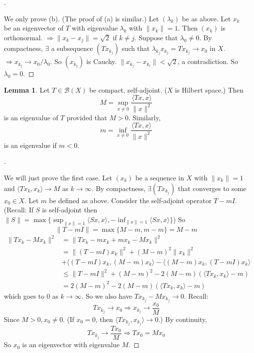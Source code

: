 \documentclass{article}
\theoremstyle{definition}
\newtheorem{lem}{Lemma}
\newenvironment{proofs}[1][\proofname]{%
  \begin{proof}[#1]$ $\par\nobreak\ignorespaces
}{%
  \end{proof}
}
\newcommand{\B}{\mathcal B}
\begin{document}
\begin{proofs}
	We only prove (b).
	(The proof of (a) is similar.)
	Let $(\lambda_k)$ be as above.
	Let $x_k$ be an eigenvector of $T$ with eigenvalue $\lambda_k$ with $\|x_k\| = 1$.
	Then $(x_k)$ is orthonormal.
	$\Rightarrow \|x_k - x_j\| = \sqrt{2}$ if $k \neq j$.
	Suppose that $\lambda_0 \neq 0$.
	By compactness, $\exists$ a subsequence $(T x_{k_j})$ such that $\lambda_{k_j} x_{k_j} = T x_{k_j} \to x_0$ in $X$.
	$\Rightarrow x_{k_j} \to x_0/\lambda_0$.
	So $(x_{k_j})$ is Cauchy.
	$\|x_{k_j} - x_{k_l}\| < \sqrt{2}$, a contradiction.
	So $\lambda_0 = 0$.
\end{proofs}

\begin{lem}
	Let $T \in \B(X)$ be compact, self-adjoint. 
	($X$ is Hilbert space.)
	Then
	\[
		M = \sup_{x \neq 0} \frac{\langle T x, x \rangle}{\|x\|^2}
	\]
	is an eigenvalue of $T$ provided that $M > 0$.
	Similarly,
	\[
		m = \inf_{x \neq 0} \frac{\langle T x, x \rangle}{\|x\|^2}
	\]
	is an eigenvalue if $m < 0$.
\end{lem}

\begin{proofs}
	We will just prove the first case.
	Let $(x_k)$ be a sequence in $X$ with $\|x_k\| = 1$ and $\langle T x_k, x_k \rangle \to M$ as $k \to \infty$.
	By compactness, $\exists (T x_{k_j})$ that converges to some $x_0 \in X$.
	Let $m$ be defined as above.
	Consider the self-adjoint operator $T - m I$.
	(Recall: If $S$ is self-adjoint then $\|S\| = \max\{ \sup_{\|x\| = 1} \langle Sx, x\rangle, -\inf_{\|x\| = 1} \langle S x, x \rangle\}$)
	So 
	\[
		\|T - mI\| = \max \{ M - m, m - m\} = M - m
	\]
	\[
		\begin{split}
			\|T x_k - M x_k\|^2 & = \|T x_k - m x_k + m x_k - M x_k\|^2\\
			& = \|(T - m I) x_k\|^2 + (M - m)^2 \|x_k\|^2 \\
			& + \langle (T - mI) x_k, (M - m) x_k \rangle - \langle (M - m) x_k, (T - mI) x_k \rangle\\
			& \leq \|T - mI\|^2 + (M - m)^2 - 2 (M - m)(\langle T x_k, x_k \rangle - m) \\
			& = 2(M - m)^2 - 2 (M - m)(\langle T x_k, x_k \rangle - m)
		\end{split}
	\]
	which goes to 0 as $k \to \infty$.
	So we also have $T x_{k_j} - M x_{k_j} \to 0$.
	Recall: 
	\[
		T x_{k_j} \to x_0 \Rightarrow x_{k_j} \to \frac{x_0}{M}
	\]
	Since $M > 0, x_0 \neq 0$.
	(If $x_0 = 0$, then $\langle T x_{k_j}, x_{k_j} \rangle \to 0$.)
	By continuity, 
	\[
		T x_{k_j} \to \frac{T x_0}{M} \Rightarrow T x_0 = M x_0
	\]
	So $x_0$ is an eigenvector with eigenvalue $M$.
\end{proofs}
\end{document}
